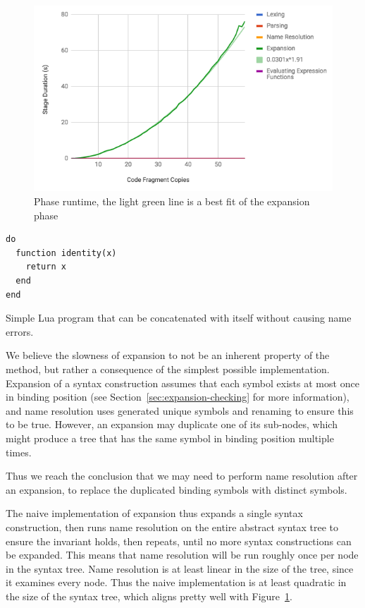 \documentclass{kththesis}
\begin{document}
\begin{figure}[t]
\includegraphics[width=\textwidth]{resources/performance-graph-with-expansion}
\caption{Phase runtime, the light green line is a best fit of the expansion phase}
\label{fig:performance-graph-with-expansion}
\end{figure}

\begin{listing}[t]
\begin{verbatim}
do
  function identity(x)
    return x
  end
end
\end{verbatim}
\caption{Simple Lua program that can be concatenated with itself without causing name errors.}
\label{lst:lua-fragment}
\end{listing}

We believe the slowness of expansion to not be an inherent property of the method, but rather a consequence of the simplest possible implementation. Expansion of a syntax construction assumes that each symbol exists at most once in binding position (see Section~\ref{sec:expansion-checking} for more information), and name resolution uses generated unique symbols and renaming to ensure this to be true. However, an expansion may duplicate one of its sub-nodes, which might produce a tree that has the same symbol in binding position multiple times.

Thus we reach the conclusion that we may need to perform name resolution after an expansion, to replace the duplicated binding symbols with distinct symbols.

The naive implementation of expansion thus expands a single syntax construction, then runs name resolution on the entire abstract syntax tree to ensure the invariant holds, then repeats, until no more syntax constructions can be expanded. This means that name resolution will be run roughly once per node in the syntax tree. Name resolution is at least linear in the size of the tree, since it examines every node. Thus the naive implementation is at least quadratic in the size of the syntax tree, which aligns pretty well with Figure~\ref{fig:performance-graph-with-expansion}.
\end{document}
